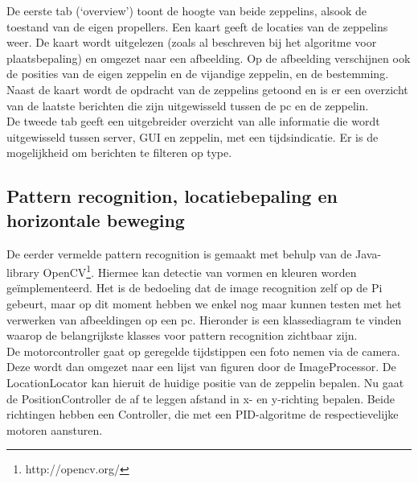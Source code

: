 \documentclass[eind]{penoverslag}
\begin{document}

De eerste tab (`overview') toont de hoogte van beide zeppelins, alsook de toestand van de eigen propellers. Een kaart geeft de locaties van de zeppelins weer. De kaart wordt uitgelezen (zoals al beschreven bij het algoritme voor plaatsbepaling) en omgezet naar een afbeelding. Op de afbeelding verschijnen ook de posities van de eigen zeppelin en de vijandige zeppelin, en de bestemming. Naast de kaart wordt de opdracht van de zeppelins getoond en is er een overzicht van de laatste berichten die zijn uitgewisseld tussen de pc en de zeppelin. \\

De tweede tab geeft een uitgebreider overzicht van alle informatie die wordt uitgewisseld tussen server, GUI en zeppelin, met een tijdsindicatie. Er is de mogelijkheid om berichten te filteren op type. \\

\subsection{Pattern recognition, locatiebepaling en horizontale beweging}
De eerder vermelde pattern recognition is gemaakt met behulp van de Java-library OpenCV\footnote{http://opencv.org/}. Hiermee kan detectie van vormen en kleuren worden ge\"{i}mplementeerd. Het is de bedoeling dat de image recognition zelf op de Pi gebeurt, maar op dit moment hebben we enkel nog maar kunnen testen met het verwerken van afbeeldingen op een pc. Hieronder is een klassediagram te vinden waarop de belangrijkste klasses voor pattern recognition zichtbaar zijn.\\
De motorcontroller gaat op geregelde tijdstippen een foto nemen via de camera. Deze wordt dan omgezet naar een lijst van figuren door de ImageProcessor. De LocationLocator kan hieruit de huidige positie van de zeppelin bepalen. Nu gaat de PositionController de af te leggen afstand in x- en y-richting bepalen. Beide richtingen hebben een Controller, die met een PID-algoritme de respectievelijke motoren aansturen.\\
\end{document}
